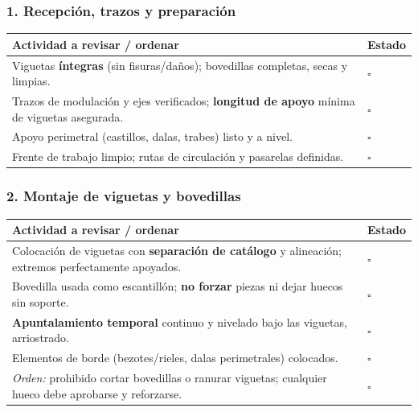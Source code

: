 \documentclass[12pt]{article}
\newcommand{\cbox}{\(\square\)}
\renewcommand{\cbox}{\(\square\)} %
\begin{document}
 \subsubsection*{1. Recepción, trazos y preparación}
 \begin{tabularx}{\linewidth}{>{\raggedright\arraybackslash}p{0.93\linewidth} >{\centering\arraybackslash}m{0.07\linewidth}}
 	\toprule
 	\textbf{Actividad a revisar / ordenar} & \textbf{Estado}\\
 	\midrule
 	Viguetas \textbf{íntegras} (sin fisuras/daños); bovedillas completas, secas y limpias. & \cbox \\
 	Trazos de modulación y ejes verificados; \textbf{longitud de apoyo} mínima de viguetas asegurada. & \cbox \\
 	Apoyo perimetral (castillos, dalas, trabes) listo y a nivel. & \cbox \\
 	Frente de trabajo limpio; rutas de circulación y pasarelas definidas. & \cbox \\
 	\bottomrule
 \end{tabularx}
 
 \subsubsection*{2. Montaje de viguetas y bovedillas}
 \begin{tabularx}{\linewidth}{>{\raggedright\arraybackslash}p{0.93\linewidth} >{\centering\arraybackslash}m{0.07\linewidth}}
 	\toprule
 	\textbf{Actividad a revisar / ordenar} & \textbf{Estado}\\
 	\midrule
 	Colocación de viguetas con \textbf{separación de catálogo} y alineación; extremos perfectamente apoyados. & \cbox \\
 	Bovedilla usada como escantillón; \textbf{no forzar} piezas ni dejar huecos sin soporte. & \cbox \\
 	\textbf{Apuntalamiento temporal} continuo y nivelado bajo las viguetas, arriostrado. & \cbox \\
 	Elementos de borde (bezotes/rieles, dalas perimetrales) colocados. & \cbox \\
 	\textit{Orden:} prohibido cortar bovedillas o ranurar viguetas; cualquier hueco debe aprobarse y reforzarse. & \cbox \\
 	\bottomrule
 \end{tabularx}
 
\end{document}
